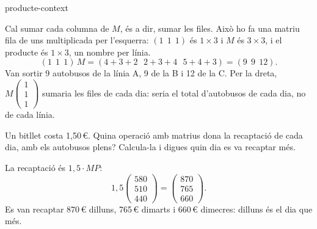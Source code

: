 \begin{apartats}
\begin{tria}{producte-context}
\begin{solucio}
Cal sumar cada columna de $M$, és a dir, sumar les files. Això ho fa una matriu fila de uns multiplicada
per l'esquerra: $(1\ \ 1\ \ 1)$ és $1\times3$ i $M$ és $3\times3$, i el producte és $1\times3$, un
nombre per línia.
\[
(1\ \ 1\ \ 1)\,M=(4+3+2\ \ \ 2+3+4\ \ \ 5+4+3)=(9\ \ 9\ \ 12).
\]
Van sortir 9 autobusos de la línia A, 9 de la B i 12 de la C. Per la dreta, $M\begin{pmatrix}1\\1\\1\end{pmatrix}$
sumaria les files de cada dia: seria el total d'autobusos de cada dia, no de cada línia.
\end{solucio}
\end{tria}

\begin{nomesllarg}
Un bitllet costa 1,50\,€. Quina operació amb matrius dona la recaptació de cada dia, amb els autobusos
plens? Calcula-la i digues quin dia es va recaptar més.

\begin{solucio}
La recaptació és $1{,}5\cdot MP$:
\[
1{,}5\begin{pmatrix}580\\510\\440\end{pmatrix}=\begin{pmatrix}870\\765\\660\end{pmatrix}.
\]
Es van recaptar 870\,€ dilluns, 765\,€ dimarts i 660\,€ dimecres: dilluns és el dia que més.
\end{solucio}
\end{nomesllarg}

\end{apartats}
